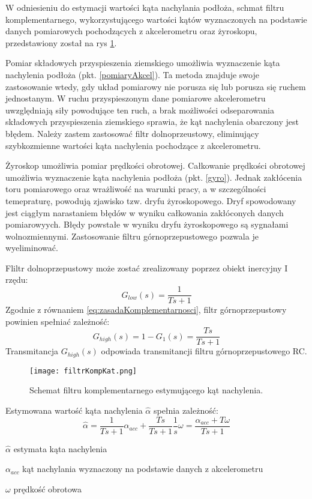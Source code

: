 W odniesieniu do estymacji wartości kąta nachylania podłoża, schmat filtru komplementarnego, wykorzystującego wartości kątów wyznaczonych na podstawie danych pomiarowych pochodzących z akcelerometru oraz żyroskopu, przedstawiony został na rys \ref{fig:kompKat}. 

Pomiar składowych przyspieszenia ziemskiego umożliwia wyznaczenie kąta nachylenia podłoża (pkt. \ref{pomiaryAkcel}). Ta metoda znajduje swoje zastosowanie wtedy, gdy układ pomiarowy nie porusza się lub porusza się ruchem jednostanym. W ruchu przyspieszonym dane pomiarowe akcelerometru uwzględniają siły powodujące ten ruch, a brak możliwości odseparowania składowych przyspieszenia ziemskiego sprawia, że kąt nachylenia obarczony jest błędem. Należy zastem zastosować filtr dolnoprzeustowy, eliminujący szybkozmienne wartości kąta nachylenia pochodzące z akcelerometru.

Żyroskop umożliwia pomiar prędkości obrotowej. Całkowanie prędkości obrotowej umożliwia wyznaczenie kąta nachylenia podłoża (pkt. \ref{gyro}). Jednak zakłócenia toru pomiarowego oraz wrażliwość na warunki pracy, a w szczególności temepraturę, powodują zjawisko tzw. dryfu żyroskopowego. Dryf spowodowany jest ciągłym narastaniem błędów w wyniku całkowania zakłóconych danych pomiarowyych. Błędy powstałe w wyniku dryfu żyroskopowego są sygnałami wolnozmiennymi. Zastosowanie filtru górnoprzepustowego pozwala je wyeliminować. 

Fliltr dolnoprzepustowy może zostać zrealizowany poprzez obiekt inercyjny I rzędu:
\begin{equation}
    G_{low}(s)=\frac{1}{Ts+1}
    \label{eq:lowPass}
\end{equation}
Zgodnie z równaniem \ref{eq:zasadaKomplementarnosci}, filtr górnoprzepustowy powinien spełniać zależność:
\begin{equation}
    G_{high}(s)=1-G_{1}(s)=\frac{Ts}{Ts+1}
    \label{eq:highPass}
\end{equation}
Transmitancja $G_{high}(s)$ odpowiada transmitancji filtru górnoprzepustowego RC.

\begin{figure}[h]
    \centering
    \texttt{[image: filtrKompKat.png]}
    \caption{Schemat filtru komplementarnego estymującego kąt nachylenia.}
    \label{fig:kompKat}
\end{figure}

Estymowana wartość kąta nachylenia $\hat{\alpha}$ spełnia zależność:
\begin{equation}
    \hat{\alpha} = \frac{1}{Ts+1}\alpha_{acc}+\frac{Ts}{Ts+1}\frac{1}{s}\omega = \frac{\alpha_{acc}+T\omega}{Ts + 1}
    \label{eq:alpha}
\end{equation}
\begin{eqwhere}[2cm]
	\item[$\hat{\alpha}$] estymata kąta nachylenia
	\item[$\alpha_{acc}$] kąt nachylania wyznaczony na podstawie danych z akcelerometru
	\item[$\omega$] prędkość obrotowa
\end{eqwhere}

